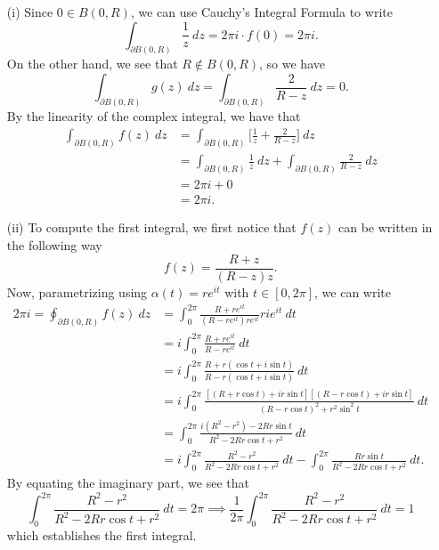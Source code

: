 \documentclass[a4paper]{article}
\begin{document}
\begin{solution}[b]
    \begin{enumerate}
        \item[(i)] Since \( 0 \in B(0,R) \), we can use Cauchy's Integral Formula to write
            \[ \int_{ \partial B(0,R) }^{  } \frac{ 1 }{ z }  \ dz = 2 \pi i  \cdot  f(0) = 2 \pi i.   \]
            On the other hand, we see that \( R \notin B(0,R) \), so we have 
            \[  \int_{ \partial B(0,R) }^{  } g(z) \ dz = \int_{ \partial B(0,R) }^{  } \frac{ 2 }{ R - z }  \ dz = 0. \]
            By the linearity of the complex integral, we have that 
            \begin{align*}
                \int_{ \partial B(0,R) }^{  }  f(z) \ dz &= \int_{ \partial B(0,R) }^{  } \Big[   \frac{ 1 }{ z }  + \frac{ 2 }{ R-z } \Big]  \ dz   \\
                &= \int_{ \partial B(0,R) }^{  }  \frac{ 1 }{ z }  \ dz + \int_{ \partial B(0,R) }^{  }  \frac{ 2  }{  R - z }  \ dz \\
                &= 2 \pi i  + 0 \\
                &= 2 \pi i.
            \end{align*}
        \item[(ii)] To compute the first integral, we first notice that \( f(z) \) can be written in the following way 
            \[  f(z) = \frac{ R +z  }{  (R-z) z }.  \]
            Now, parametrizing using \( \alpha(t) = r e^{i t  } \) with \( t \in [0, 2\pi] \), we can write
            \begin{align*}
                2 \pi i = \oint_{ \partial B(0,R) }^{  } f(z) \ dz    &=  \int_{ 0  }^{ 2 \pi } \frac{ R + r e^{i t } }{ (R - r e^{it }) r e^{it } } ri e^{i t}  \ dt \\
                                                           &= i \int_{ 0  }^{  2 \pi  } \frac{ R + r e^{it } }{ R - r e^{it } }  \ dt \\
                                                           &= i \int_{ 0 }^{ 2 \pi } \frac{ R + r(\cos t + i \sin t) }{ R - r (\cos t + i \sin t ) }  \ dt \\  
                                                           &= i \int_{ 0 }^{ 2 \pi  }  \frac{  [(R + r\cos t) + i r \sin t ] [ (R - r \cos t ) + ir \sin t ] }{ (R - r\cos t )^{2} + r^{2} \sin^{2} t }  \ dt \\
                                                           &= \int_{ 0  }^{ 2 \pi }  \frac{ i (R^{2} - r^{2}) - 2Rr \sin t }{ R^{2} - 2Rr \cos t + r^{2} }  \ dt \\
                                                           &= i \int_{ 0  }^{  2 \pi  }  \frac{ R^{2} - r^{2} }{ R^{2} - 2R r \cos t + r^{2} }  \ dt - \int_{  0 }^{ 2\pi  } \frac{ Rr \sin t  }{ R^{2} - 2Rr \cos t + r^{2} }  \ dt.
            \end{align*}
           By equating the imaginary part, we see that  
           \[  \int_{  0  }^{ 2 \pi } \frac{ R^{2} - r^{2} }{ R^{2} - 2Rr \cos t + r^{2} }  \ dt = 2 \pi \implies \frac{ 1 }{ 2 \pi }  \int_{ 0 }^{  2 \pi  } \frac{ R^{2} - r^{2} }{ R^{2} - 2Rr \cos t + r^{2} }  \ dt = 1  \]
           which establishes the first integral.


\end{enumerate}
\end{solution}
\end{document}
